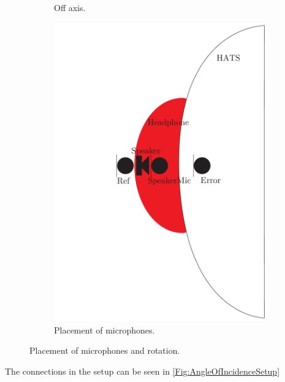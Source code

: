\begin{figure}[H]
\begin{subfigure}[b]{.4\textwidth}
		\caption{Off axis.}
		\label{fig:AngOfIndOffax}
	\end{subfigure} 
	\begin{subfigure}[b]{.4\textwidth}
	\centering
	\includegraphics[width=\textwidth]{../Journal/Experiments/AngleOfIncidence/AngleOfIncidenceSchematic.pdf}
	\caption{Placement of microphones.}
	\label{fig:AngOgIndMicplace}
\end{subfigure}
	\caption{Placement of microphones and rotation.}
	\label{fig:AngleOfIndDiagram}
\end{figure}
The connections in the setup can be seen in \autoref{Fig:AngleOfIncidenceSetup}
